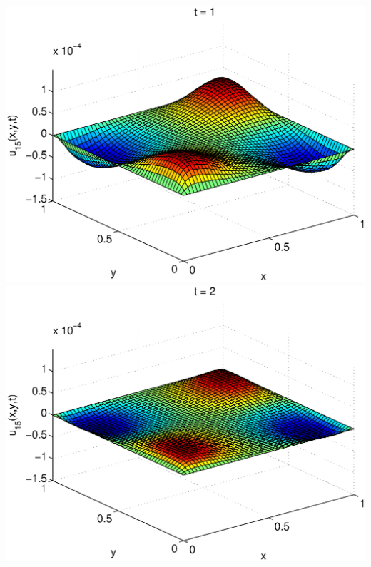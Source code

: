 \begin{solution}
\begin{enumerate}
\includegraphics[scale=0.4]{heat2d5}
\includegraphics[scale=0.4]{heat2d6}


\end{enumerate}
\end{solution}